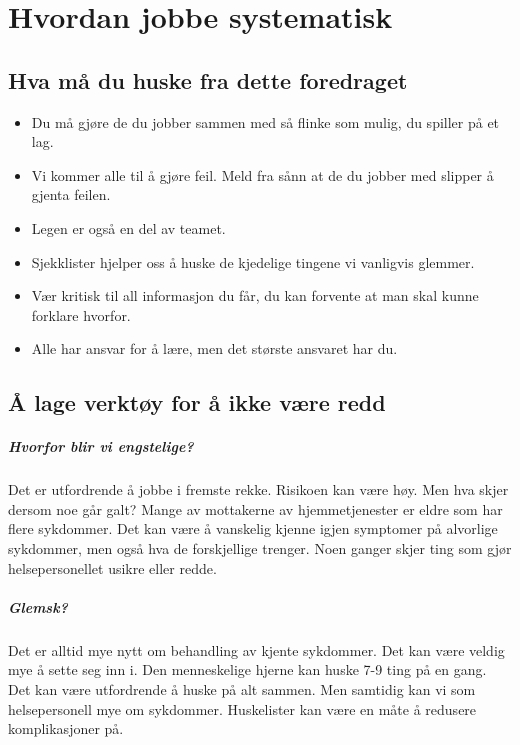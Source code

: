 	\chapter{Hvordan jobbe systematisk}
		\section{Hva må du huske fra dette foredraget}
			\begin{itemize}
				\item Du må gjøre de du jobber sammen med så flinke som mulig, du spiller på et lag.\\
				\item Vi kommer alle til å gjøre feil. Meld fra sånn at de du jobber med slipper å gjenta feilen.\\
				\item Legen er også en del av teamet.\\
				\item Sjekklister hjelper oss å huske de kjedelige tingene vi vanligvis glemmer.\\
				\item Vær kritisk til all informasjon du får, du kan forvente at man skal kunne forklare hvorfor.\\
				\item Alle har ansvar for å lære, men det største ansvaret har du.\\
			\end{itemize}
		\section{Å lage verktøy for å ikke være redd}
			\paragraph{Hvorfor blir vi engstelige?\\}
				Det er utfordrende å jobbe i fremste rekke. Risikoen kan være høy. Men hva skjer dersom noe går galt? Mange av mottakerne av hjemmetjenester er eldre som har flere sykdommer. Det kan være å vanskelig kjenne igjen symptomer på alvorlige sykdommer, men også hva de forskjellige trenger. Noen ganger skjer ting som gjør helsepersonellet usikre eller redde.
			\paragraph{Glemsk?\\}
				Det er alltid mye nytt om behandling av kjente sykdommer. Det kan være veldig mye å sette seg inn i. Den menneskelige hjerne kan huske 7-9 ting på en gang. Det kan være utfordrende å huske på alt sammen. Men samtidig kan vi som helsepersonell mye om sykdommer. Huskelister kan være en måte å redusere komplikasjoner på\cite{FA-gawande}.
